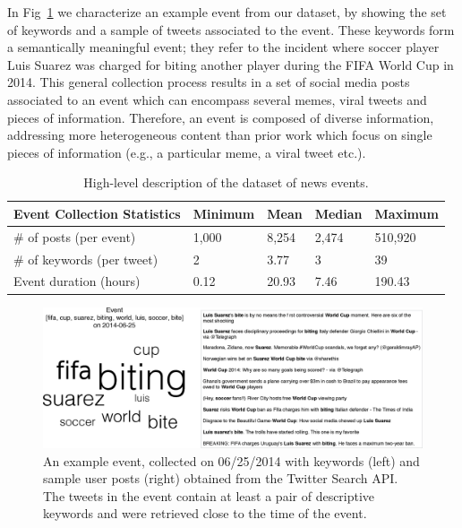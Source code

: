 In Fig~\ref{fig:fig2} we characterize an example event from our
dataset, by showing the set of keywords and a sample of tweets
associated to the event. These keywords form a semantically meaningful
event; they refer to the incident where soccer player Luis Suarez was
charged for biting another player during the FIFA World Cup in
2014. This general collection process results in a set of social media
posts associated to an event which can encompass several memes, viral
tweets and pieces of information. Therefore, an event is composed of
diverse information, addressing more heterogeneous content than prior
work
\cite{Castillo:2014,Szabo:2010,Lerman:2010,Tatar:2011,Pinto:2013,Ahmed:2013,suh2010want}
which focus on single pieces of information (e.g., a
particular meme, a viral tweet etc.).
\begin{table}[!htb]
  \centering
  \begin{tabularx}{\textwidth}{@{}p{6cm}llll@{}}
    \toprule
    \textbf{Event Collection Statistics} & \textbf{Minimum} & \textbf{Mean} & \textbf{Median} & \textbf{Maximum} \\ \midrule
    \# of posts (per event) & 1,000 & 8,254 & 2,474 & 510,920 \\
    \# of keywords (per tweet) & 2 & 3.77 & 3 & 39 \\
    Event duration (hours) & 0.12 & 20.93 & 7.46 & 190.43 \\ \bottomrule
  \end{tabularx}
  \caption[Dataset description]{High-level description of the dataset of news events.} \label{table:dataset-stats}
\end{table}

\begin{figure}[!htb]
    \includegraphics[width=\textwidth]{PLOSONE/figures/plots_revision/fig2}
  \caption[Example event collected using methodology]{{An example event, collected on 06/25/2014
      with keywords (left) and sample user posts (right) obtained
      from the Twitter Search API. The tweets in the event contain at
      least a pair of descriptive keywords and were retrieved close to the time
      of the event.}}
  \label{fig:fig2}
\end{figure}

